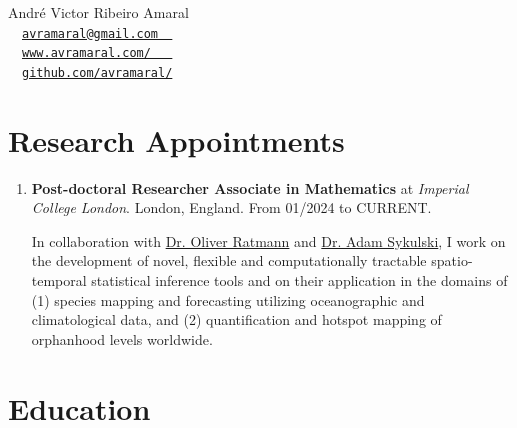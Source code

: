 \documentclass[10pt, ]{article}
\begin{document}
	
	\begin{center}
		{\LARGE André Victor Ribeiro Amaral} \\ \vspace{3pt}
		{\small\faEnvelope~~\href{mailto:avramaral@gmail.com}{\texttt{avramaral@gmail.com~~}}} \\
		{\small\faDesktop~~\href{https://www.avramaral.com/}{\texttt{www.avramaral.com/~~~}}}	\\
		{\small\faGithubAlt~~\href{https://github.com/avramaral/}{\texttt{github.com/avramaral/}}}	
	\end{center}
	
	\vspace{-12pt}
	\section*{Research Appointments} \vspace{-5pt}
	
	\begin{enumerate}[noitemsep, topsep=0pt]
		\item \textbf{Post-doctoral Researcher Associate in Mathematics} at \textit{Imperial College London}. London, England. From 01/2024 to CURRENT. \vspace{3pt}
		
		In collaboration with \href{https://www.imperial.ac.uk/people/oliver.ratmann05}{Dr. Oliver Ratmann} and \href{https://www.imperial.ac.uk/people/adam.sykulski}{Dr. Adam Sykulski}, I work on the development of novel, flexible and computationally tractable spatio-temporal statistical inference tools and on their application in the domains of (1) species mapping and forecasting utilizing oceanographic and climatological data, and (2) quantification and hotspot mapping of orphanhood levels worldwide.
		
	\end{enumerate}
	
	\vspace{10pt}
	
	\vspace{-12pt}
	\section*{Education} \vspace{-5pt}
	
\end{document}
